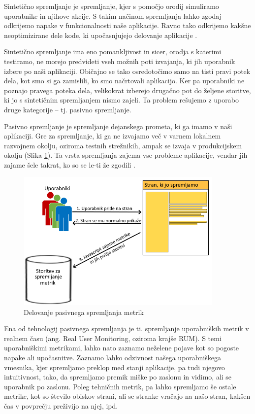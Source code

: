 \documentclass[a4paper, 12pt]{book}
\begin{document}
Sintetično spremljanje je spremljanje, kjer s pomočjo orodij simuliramo uporabnike in njihove akcije. S takim načinom spremljanja lahko zgodaj odkrijemo napake v funkcionalnosti naše aplikacije. Ravno tako odkrijemo kakšne neoptimizirane dele kode, ki upočasnjujejo delovanje aplikacije \cite{what_is_rum}.

Sintetično spremljanje ima eno pomankljivost in sicer, orodja s katerimi testiramo, ne morejo predvideti vseh možnih poti izvajanja, ki jih uporabnik izbere po naši aplikaciji. Običajno se tako osredotočimo samo na tisti pravi potek dela, kot smo si ga zamislili, ko smo načrtovali aplikacijo. Ker pa uporabniki ne poznajo pravega poteka dela, velikokrat izberejo drugačno pot do željene storitve, ki jo s sintetičnim spremljanjem nismo zajeli. Ta problem rešujemo z uporabo druge kategorije – tj.  pasivno spremljanje.

Pasivno spremljanje je spremljanje dejanskega prometa, ki ga imamo v naši aplikaciji. Gre za spremljanje, ki ga ne izvajamo več v varnem lokalnem razvojnem okolju, oziroma testnih strežnikih, ampak se izvaja v produkcijskem okolju (Slika \ref{img:rum}). Ta vrsta spremljanja zajema vse probleme aplikacije, vendar jih zajame šele takrat, ko so se le-ti že zgodili \cite{rum_o_reilly}.

\begin{figure}[h]
	\begin{center}
		\includegraphics[width=0.9\textwidth]{rum_diagram.png}
	\end{center}
	\caption{Delovanje pasivnega spremljanja metrik}
	\label{img:rum}
\end{figure}

Ena od tehnologij pasivnega spremljanja je ti. spremljanje uporabniških metrik v realnem času (ang. Real User Monitoring, oziroma krajše RUM). S temi uporabniškimi metrikami, lahko nato zaznamo neželene pojave kot so pogoste napake ali upočasnitve. Zaznamo lahko odzivnost našega uporabniškega vmesnika, kjer spremljamo preklop med stanji aplikacije, pa tudi njegovo intuitivnost, tako, da spremljamo premik miške po zaslonu in vidimo, ali se uporabnik  po zaslonu. Poleg tehničnih metrik, pa lahko spremljamo še ostale metrike, kot so število obiskov strani, ali se stranke vračajo na našo stran, kakšen čas v povprečju preživijo na njej, ipd.
\end{document}
